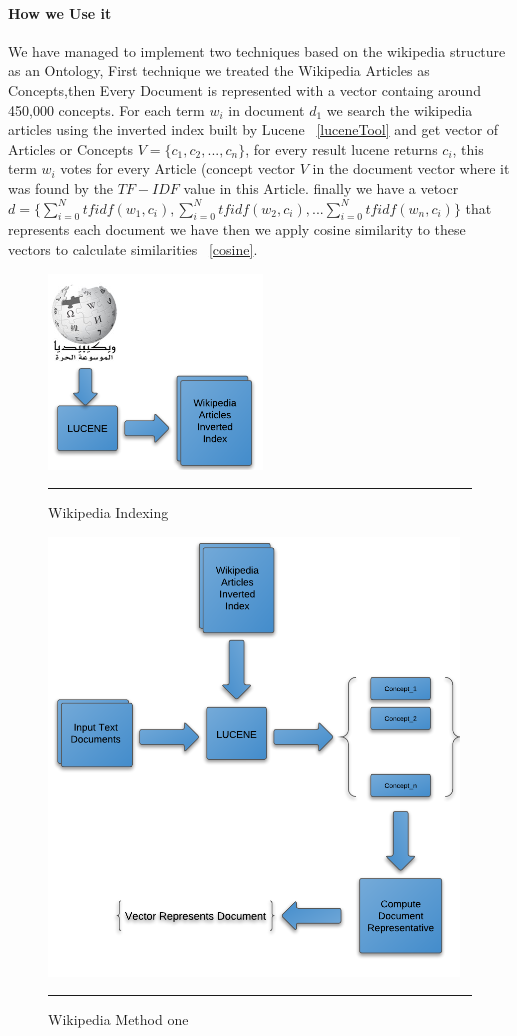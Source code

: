 \paragraph{How we Use it}
We have managed to implement two techniques based on the wikipedia structure as an Ontology, First technique we treated the Wikipedia Articles as Concepts\citep{wiki_1},then Every Document is represented with a vector containg around 450,000 concepts.
For each term $w_i$ in document $d_1$ we search the wikipedia articles using the inverted index built by Lucene ~\ref{luceneTool} and get vector of Articles or Concepts $V = \{c_1,c_2,...,c_n\}$, for every result lucene returns $c_i$, this term $w_i$ votes for every Article (concept  vector $V$ in the document vector where it was found by the $TF-IDF$ value in this Article.
finally we have a vetocr $d =\{\sum_{i=0}^{N} tfidf(w_1,c_i),\sum_{i=0}^{N} tfidf(w_2,c_i),...\sum_{i=0}^{N} tfidf(w_n,c_i)\} $ that represents each document we have then we apply cosine similarity to these vectors to calculate similarities ~\ref{cosine}.\\
\begin{figure}[htbp]
	\centering
		\includegraphics{./Figures/wiki_1.png}
		\rule{35em}{0.05pt}
	\caption[Wikipedia Indexing]{Wikipedia Indexing}
	\label{fig:Indexing}
\end{figure}

\begin{figure}[htbp]
	\centering
		\includegraphics{./Figures/wiki_3.png}
		\rule{35em}{0.05pt}
	\caption[Wikipedia Method one]{Wikipedia Method one}
	\label{fig:Method one}
\end{figure}

